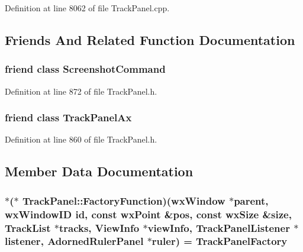 Definition at line 8062 of file Track\+Panel.\+cpp.



\subsection{Friends And Related Function Documentation}
\subsubsection[{\texorpdfstring{Screenshot\+Command}{ScreenshotCommand}}]{\setlength{\rightskip}{0pt plus 5cm}friend class {\bf Screenshot\+Command}\hspace{0.3cm}{\ttfamily [friend]}}\hypertarget{class_track_panel_a760b79a183ea3e3e0a058eb7c0fa3564}{}\label{class_track_panel_a760b79a183ea3e3e0a058eb7c0fa3564}


Definition at line 872 of file Track\+Panel.\+h.

\subsubsection[{\texorpdfstring{Track\+Panel\+Ax}{TrackPanelAx}}]{\setlength{\rightskip}{0pt plus 5cm}friend class {\bf Track\+Panel\+Ax}\hspace{0.3cm}{\ttfamily [friend]}}\hypertarget{class_track_panel_af348cec23cce5263e8a0acd36e7d594e}{}\label{class_track_panel_af348cec23cce5263e8a0acd36e7d594e}


Definition at line 860 of file Track\+Panel.\+h.



\subsection{Member Data Documentation}
\subsubsection[{\texorpdfstring{Factory\+Function}{FactoryFunction}}]{ $\ast$($\ast$ Track\+Panel\+::\+Factory\+Function)(wx\+Window $\ast$parent, wx\+Window\+ID id, {\bf const} wx\+Point \&pos, {\bf const} wx\+Size \&{\bf size}, {\bf Track\+List} $\ast$tracks, {\bf View\+Info} $\ast$view\+Info, {\bf Track\+Panel\+Listener} $\ast$listener, {\bf Adorned\+Ruler\+Panel} $\ast$ruler) = Track\+Panel\+Factory\hspace{0.3cm}{\ttfamily [static]}}\hypertarget{class_track_panel_ab446ba22f650d9366bac877c10ebe4f8}{}\label{class_track_panel_ab446ba22f650d9366bac877c10ebe4f8}



